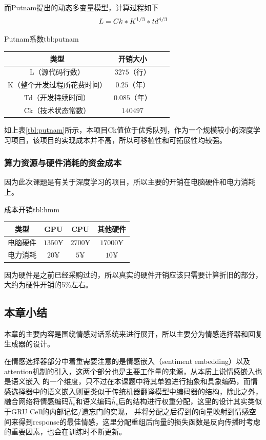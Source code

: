 \documentclass[supercite]{HustGraduPaper}
\theoremstyle{definition}
\begin{document}
而Putnam提出的动态多变量模型，计算过程如下
\begin{align}
  L = Ck * K^{1/3} * td^{4/3} \notag
\end{align}

\begin{generaltab}{Putnam系数}{tbl:putnam}
  \begin{tabular}{c|ccc}
    \toprule
    类型 & 开销大小 \\
    \midrule
    L（源代码行数） & $3275$（行） \\
    K（整个开发过程所花费时间） & $0.25$（年）\\
    Td（开发持续时间）& $0.085$（年）\\
    Ck（技术状态常数）& $140497$ \\
    \bottomrule
  \end{tabular}
\end{generaltab}
如上表\ref{tbl:putnam}所示，本项目Ck值位于优秀队列，作为一个规模较小的深度学习项目，该项目的实现成本并不高，所以可移植性和可拓展性均较强。

\subsubsection{算力资源与硬件消耗的资金成本}
因为此次课题是有关于深度学习的项目，所以主要的开销在电脑硬件和电力消耗上。
\begin{generaltab}{成本开销}{tbl:hmm}
  \begin{tabular}{c|ccc}
    \toprule
    类型 & GPU & CPU & 其他硬件 \\
    \midrule
    电脑硬件 & $1350¥$ & $2700¥$ & $17000¥$ \\
    电力消耗 & $20¥$ & $5¥$ & $10¥$ \\
    \bottomrule
  \end{tabular}
\end{generaltab}
因为硬件是之前已经采购过的，所以真实的硬件开销应该只需要计算折旧的部分，大约为硬件开销的5\%左右。


\subsection{本章小结}
本章的主要内容是围绕情感对话系统来进行展开，所以主要分为情感选择器和回复生成器的设计。

在情感选择器部分中着重需要注意的是情感嵌入（sentiment embedding）以及attention机制的引入，这两个部分也是主要工作量的来源，从本质上说情感嵌入也是语义嵌入
的一个维度，只不过在本课题中将其单独进行抽象和具象编码，而情感选择器中的语义嵌入则更类似于传统机器翻译模型中编码器的结构，除此之外，
融合网络将情感编码$\widehat{h_e}$和语义编码$\widetilde{h_s}$后的结构进行权重分配，这里的设计其实类似于GRU Cell的内部记忆/遗忘门的实现，
并将分配之后得到的向量映射到情感空间来得到response的最佳情感，这里分配重组后向量的损失函数是反向传播时考虑的重要因素，也会在训练时不断更新。
\end{document}
